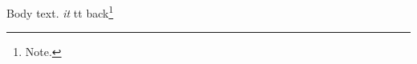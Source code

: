 \documentclass{article}
\begin{document}
Body text. \textit{it} {\ttfamily tt \normalfont back}\footnote{Note.}
\end{document}
